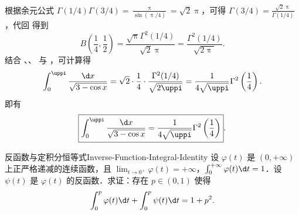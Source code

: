\begin{myproof}
\begin{equation}
    \end{equation}
    根据余元公式 $\Gamma(1/4)\Gamma(3/4) = \frac{\uppi}{\sin(\uppi/4)} = \sqrt{2}\uppi$，可得 $\Gamma(3/4) = \frac{\sqrt{2}\uppi}{\Gamma(1/4)}$，代回  得到
    \begin{equation}\label{eq:q13-beta-final}
        B\left(\frac{1}{4}, \frac{1}{2}\right) = \frac{\sqrt{\uppi}\Gamma^2(1/4)}{\sqrt{2}\uppi} = \frac{\Gamma^2(1/4)}{\sqrt{2\uppi}}.
    \end{equation}
    结合 、、 与 ，可计算得
    \begin{equation}\label{eq:q13-final-calc}
        \int_0^{\uppi} \frac{\d x}{\sqrt{3 - \cos x}} = \sqrt{2} \cdot \frac{1}{4} \cdot \frac{\Gamma^2(1/4)}{\sqrt{2\uppi}} = \frac{1}{4\sqrt{\uppi}} \Gamma^2\left(\frac{1}{4}\right).
    \end{equation}
    即有
    \begin{equation}\label{eq:q13-final}
        \boxed{\int_0^{\uppi} \frac{\d x}{\sqrt{3 - \cos x}} = \frac{1}{4\sqrt{\uppi}} \Gamma^2\left(\frac{1}{4}\right)}.
    \end{equation}
\end{myproof}

\begin{problem}{反函数与定积分恒等式}{Inverse-Function-Integral-Identity}
    设 $\varphi(t)$ 是 $(0,+\infty)$ 上正严格递减的连续函数，且 $\lim_{t\to0^+} \varphi(t) = +\infty$，$\int_0^{+\infty} \varphi(t) \d t = 1$．设 $\psi(t)$ 是 $\varphi(t)$ 的反函数．求证：存在 $p \in (0, 1)$ 使得
    \begin{equation}\label{eq:q14-target-1}
        \int_0^p \varphi(t) \d t + \int_0^p \psi(t) \d t = 1 + p^2.
    \end{equation}
\end{problem}

